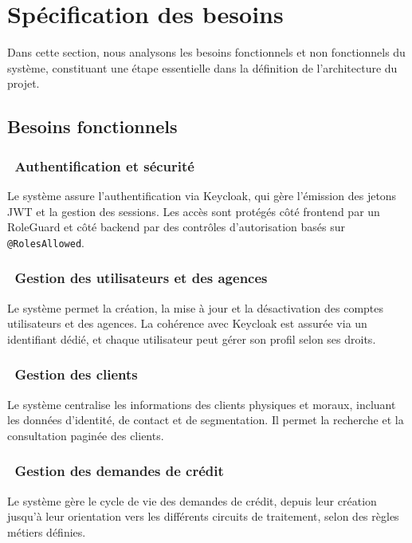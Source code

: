 \section{Spécification des besoins}

Dans cette section, nous analysons les besoins fonctionnels et non fonctionnels du système,
constituant une étape essentielle dans la définition de l'architecture du projet.

\subsection{Besoins fonctionnels}

\subsubsection*{~Authentification et sécurité}

Le système assure l'authentification via Keycloak, qui gère l'émission des jetons JWT et la
gestion des sessions. Les accès sont protégés côté frontend par un RoleGuard et côté backend
par des contrôles d'autorisation basés sur \texttt{@RolesAllowed}.

\subsubsection*{~Gestion des utilisateurs et des agences}

Le système permet la création, la mise à jour et la désactivation des comptes utilisateurs
et des agences. La cohérence avec Keycloak est assurée via un identifiant dédié, et chaque
utilisateur peut gérer son profil selon ses droits.

\subsubsection*{~Gestion des clients}

Le système centralise les informations des clients physiques et moraux, incluant les données
d'identité, de contact et de segmentation. Il permet la recherche et la consultation paginée
des clients.

\subsubsection*{~Gestion des demandes de crédit}

Le système gère le cycle de vie des demandes de crédit, depuis leur création jusqu'à leur
orientation vers les différents circuits de traitement, selon des règles métiers définies.

